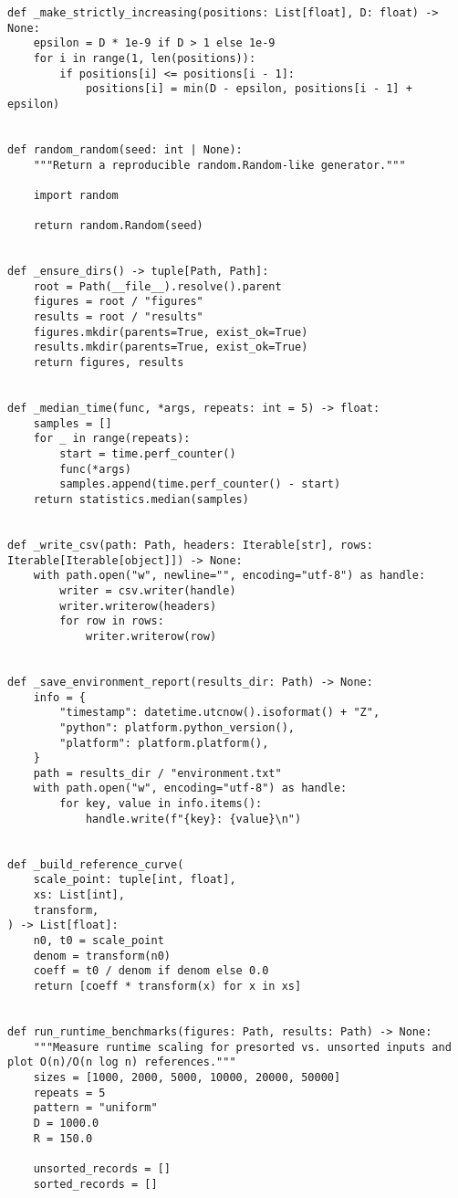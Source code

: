 \begin{lstlisting}[caption={Benchmark and plotting harness},label={lst:ev-benchmark}]
def _make_strictly_increasing(positions: List[float], D: float) -> None:
    epsilon = D * 1e-9 if D > 1 else 1e-9
    for i in range(1, len(positions)):
        if positions[i] <= positions[i - 1]:
            positions[i] = min(D - epsilon, positions[i - 1] + epsilon)


def random_random(seed: int | None):
    """Return a reproducible random.Random-like generator."""

    import random

    return random.Random(seed)


def _ensure_dirs() -> tuple[Path, Path]:
    root = Path(__file__).resolve().parent
    figures = root / "figures"
    results = root / "results"
    figures.mkdir(parents=True, exist_ok=True)
    results.mkdir(parents=True, exist_ok=True)
    return figures, results


def _median_time(func, *args, repeats: int = 5) -> float:
    samples = []
    for _ in range(repeats):
        start = time.perf_counter()
        func(*args)
        samples.append(time.perf_counter() - start)
    return statistics.median(samples)


def _write_csv(path: Path, headers: Iterable[str], rows: Iterable[Iterable[object]]) -> None:
    with path.open("w", newline="", encoding="utf-8") as handle:
        writer = csv.writer(handle)
        writer.writerow(headers)
        for row in rows:
            writer.writerow(row)


def _save_environment_report(results_dir: Path) -> None:
    info = {
        "timestamp": datetime.utcnow().isoformat() + "Z",
        "python": platform.python_version(),
        "platform": platform.platform(),
    }
    path = results_dir / "environment.txt"
    with path.open("w", encoding="utf-8") as handle:
        for key, value in info.items():
            handle.write(f"{key}: {value}\n")


def _build_reference_curve(
    scale_point: tuple[int, float],
    xs: List[int],
    transform,
) -> List[float]:
    n0, t0 = scale_point
    denom = transform(n0)
    coeff = t0 / denom if denom else 0.0
    return [coeff * transform(x) for x in xs]


def run_runtime_benchmarks(figures: Path, results: Path) -> None:
    """Measure runtime scaling for presorted vs. unsorted inputs and plot O(n)/O(n log n) references."""
    sizes = [1000, 2000, 5000, 10000, 20000, 50000]
    repeats = 5
    pattern = "uniform"
    D = 1000.0
    R = 150.0

    unsorted_records = []
    sorted_records = []


\end{lstlisting}
